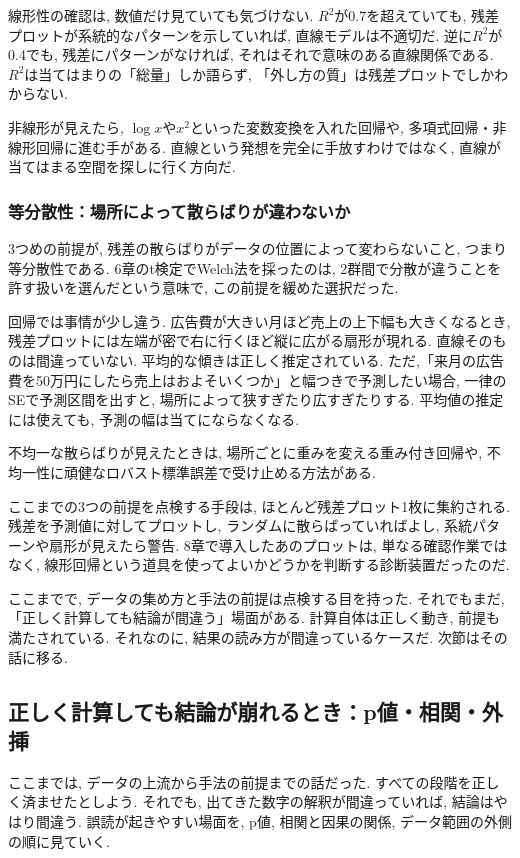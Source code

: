 線形性の確認は, 数値だけ見ていても気づけない.
$R^2$が0.7を超えていても, 残差プロットが系統的なパターンを示していれば, 直線モデルは不適切だ.
逆に$R^2$が0.4でも, 残差にパターンがなければ, それはそれで意味のある直線関係である.
$R^2$は当てはまりの「総量」しか語らず, 「外し方の質」は残差プロットでしかわからない.

非線形が見えたら, $\log x$や$x^2$といった変数変換を入れた回帰や, 多項式回帰・非線形回帰に進む手がある. 直線という発想を完全に手放すわけではなく, 直線が当てはまる空間を探しに行く方向だ.

\subsubsection*{等分散性：場所によって散らばりが違わないか}

3つめの前提が, 残差の散らばりがデータの位置によって変わらないこと, つまり等分散性である.
6章のt検定でWelch法を採ったのは, 2群間で分散が違うことを許す扱いを選んだという意味で, この前提を緩めた選択だった.

回帰では事情が少し違う.
広告費が大きい月ほど売上の上下幅も大きくなるとき, 残差プロットには左端が密で右に行くほど縦に広がる扇形が現れる.
直線そのものは間違っていない. 平均的な傾きは正しく推定されている.
ただ,「来月の広告費を50万円にしたら売上はおよそいくつか」と幅つきで予測したい場合, 一律のSEで予測区間を出すと, 場所によって狭すぎたり広すぎたりする.
平均値の推定には使えても, 予測の幅は当てにならなくなる.

不均一な散らばりが見えたときは, 場所ごとに重みを変える重み付き回帰や, 不均一性に頑健なロバスト標準誤差で受け止める方法がある.

ここまでの3つの前提を点検する手段は, ほとんど残差プロット1枚に集約される.
残差を予測値に対してプロットし, ランダムに散らばっていればよし, 系統パターンや扇形が見えたら警告.
8章で導入したあのプロットは, 単なる確認作業ではなく, 線形回帰という道具を使ってよいかどうかを判断する診断装置だったのだ.

ここまでで, データの集め方と手法の前提は点検する目を持った.
それでもまだ,「正しく計算しても結論が間違う」場面がある.
計算自体は正しく動き, 前提も満たされている. それなのに, 結果の読み方が間違っているケースだ.
次節はその話に移る.


\subsection{正しく計算しても結論が崩れるとき：p値・相関・外挿}

ここまでは, データの上流から手法の前提までの話だった.
すべての段階を正しく済ませたとしよう.
それでも, 出てきた数字の解釈が間違っていれば, 結論はやはり間違う.
誤読が起きやすい場面を, p値, 相関と因果の関係, データ範囲の外側の順に見ていく.

